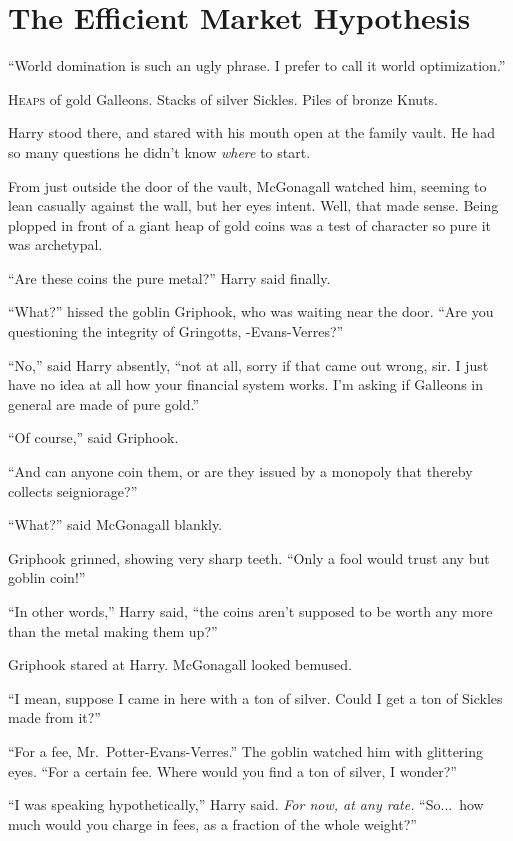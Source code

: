 \chapter{The Efficient Market Hypothesis}

\epigraph{“World domination is such an ugly phrase. I prefer to call it world optimization.”}{}

\lettrine{H}{eaps} of gold Galleons. Stacks of silver Sickles. Piles of bronze Knuts.

Harry stood there, and stared with his mouth open at the family vault. He had so many questions he didn’t know \emph{where} to start.

From just outside the door of the vault, McGonagall watched him, seeming to lean casually against the wall, but her eyes intent. Well, that made sense. Being plopped in front of a giant heap of gold coins was a test of character so pure it was archetypal.

“Are these coins the pure metal?” Harry said finally.

“What?” hissed the goblin Griphook, who was waiting near the door. “Are you questioning the integrity of Gringotts, -Evans-Verres?”

“No,” said Harry absently, “not at all, sorry if that came out wrong, sir. I just have no idea at all how your financial system works. I’m asking if Galleons in general are made of pure gold.”

“Of course,” said Griphook.

“And can anyone coin them, or are they issued by a monopoly that thereby collects seigniorage?”

“What?” said McGonagall blankly.

Griphook grinned, showing very sharp teeth. “Only a fool would trust any but goblin coin!”

“In other words,” Harry said, “the coins aren’t supposed to be worth any more than the metal making them up?”

Griphook stared at Harry. McGonagall looked bemused.

“I mean, suppose I came in here with a ton of silver. Could I get a ton of Sickles made from it?”

“For a fee, Mr.~Potter-Evans-Verres.” The goblin watched him with glittering eyes. “For a certain fee. Where would you find a ton of silver, I wonder?”

“I was speaking hypothetically,” Harry said. \emph{For now, at any rate.} “So...\ how much would you charge in fees, as a fraction of the whole weight?”

